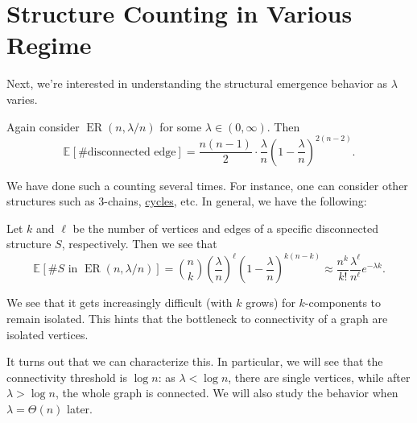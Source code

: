 \section{Structure Counting in Various Regime}
Next, we're interested in understanding the structural emergence behavior as \(\lambda \) varies.

\begin{eg}
	Again consider \(\operatorname{ER}(n, \lambda / n) \) for some \(\lambda \in (0, \infty )\). Then
	\[
		\mathbb{E}_{}[\text{\#disconnected edge} ]
		= \frac{n(n-1)}{2} \cdot \frac{\lambda}{n} \left( 1 - \frac{\lambda}{n} \right) ^{2 (n-2)}.
	\]
\end{eg}

We have done such a counting several times. For instance, one can consider other structures such as \(3\)-chains, \hyperref[def:cycle]{cycles}, etc. In general, we have the following:

\begin{eg}
	Let \(k\) and \(\ell \) be the number of vertices and edges of a specific disconnected structure \(S\), respectively. Then we see that
	\[
		\mathbb{E}_{}[\# S \text{ in } \operatorname{ER}(n, \lambda / n) ]
		= \binom{n}{k} \left( \frac{\lambda}{n} \right) ^{\ell } \left( 1 - \frac{\lambda}{n} \right) ^{k(n-k)}
		\approx \frac{n^k}{k!} \frac{\lambda ^\ell }{n^{\ell } } e^{-\lambda k}.
	\]
\end{eg}

\begin{intuition}
	We see that it gets increasingly difficult (with \(k\) grows) for \(k\)-components to remain isolated. This hints that the bottleneck to connectivity of a graph are isolated vertices.
\end{intuition}

It turns out that we can characterize this. In particular, we will see that the connectivity threshold is \(\log n\): as \(\lambda < \log n\), there are single vertices, while after \(\lambda > \log n\), the whole graph is connected. We will also study the behavior when \(\lambda = \Theta (n)\) later.